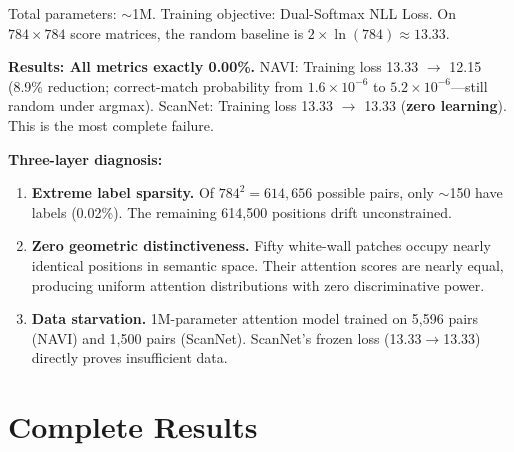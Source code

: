 \documentclass[11pt,a4paper]{article}
\begin{document}
Total parameters: $\sim$1M. Training objective: Dual-Softmax NLL Loss. On $784\!\times\!784$ score matrices, the random baseline is $2\times\ln(784) \approx 13.33$.

\textbf{Results: All metrics exactly 0.00\%.}
NAVI: Training loss 13.33 $\rightarrow$ 12.15 (8.9\% reduction; correct-match probability from $1.6\!\times\!10^{-6}$ to $5.2\!\times\!10^{-6}$---still random under argmax).
ScanNet: Training loss 13.33 $\rightarrow$ 13.33 (\textbf{zero learning}). This is the most complete failure.

\textbf{Three-layer diagnosis:}
\begin{enumerate}
    \item \textbf{Extreme label sparsity.} Of $784^2 = 614{,}656$ possible pairs, only $\sim$150 have labels (0.02\%). The remaining 614{,}500 positions drift unconstrained.
    \item \textbf{Zero geometric distinctiveness.} Fifty white-wall patches occupy nearly identical positions in semantic space. Their attention scores are nearly equal, producing uniform attention distributions with zero discriminative power.
    \item \textbf{Data starvation.} 1M-parameter attention model trained on 5,596 pairs (NAVI) and 1,500 pairs (ScanNet). ScanNet's frozen loss (13.33$\rightarrow$13.33) directly proves insufficient data.
\end{enumerate}

\section{Complete Results}
\end{document}
